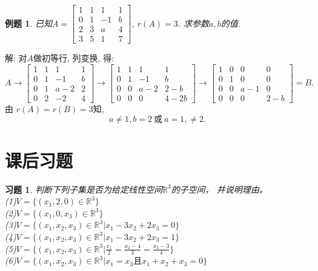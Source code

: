 \documentclass[a4paper]{book}
\newtheorem{eg}{例题}[chapter]
\newtheorem{ex}{习题}[chapter]
\begin{document}
\begin{eg}
已知$A=\begin{bmatrix}1&1&1&1\\0&1&-1&b\\2&3&a&4\\3&5&1&7\end{bmatrix},\ r(A)=3$. 求参数$a,b$的值.
\end{eg}
解: 对$A$做初等行, 列变换, 得:
\begin{displaymath}
A\rightarrow\begin{bmatrix}1&1&1&1\\0&1&-1&b\\0&1&a-2&2\\0&2&-2&4\end{bmatrix}
\rightarrow\begin{bmatrix}1&1&1&1\\0&1&-1&b\\0&0&a-2&2-b\\0&0&0&4-2b\end{bmatrix}
\rightarrow\begin{bmatrix}1&0&0&0\\0&1&0&0\\0&0&a-1&0\\0&0&0&2-b\end{bmatrix}=B.
\end{displaymath}
由 $r(A)=r(B)=3$知,
$$a\not= 1, b=2\ \mbox{或}\ a=1,\not=2.$$


\section{课后习题}

\begin{ex}\label{4.1}
判断下列子集是否为给定线性空间$\mathbb{R}^3$的子空间， 并说明理由。\\
(1)$V=\{(x_1,2,0)\in \mathbb{R}^3\}$\\
(2)$V=\{(x_1,0,x_3)\in \mathbb{R}^3\}$\\
(3)$V=\{(x_1,x_2,x_3)\in \mathbb{R}^3| x_1-3x_2+2x_3=0\}$\\
(4)$V=\{(x_1,x_2,x_3)\in \mathbb{R}^3| x_1-3x_2+2x_3=1\}$\\
(5)$V=\{(x_1,x_2,x_3)\in \mathbb{R}^3|\frac{x_1}{2}=\frac{x_2-4}{3}=\frac{x_3-3}{4}\}$\\
(6)$V=\{(x_1,x_2,x_3)\in \mathbb{R}^3|x_1=x_3\mbox{且}x_1+x_2+x_3=0\}$
\end{ex}
\end{document}
